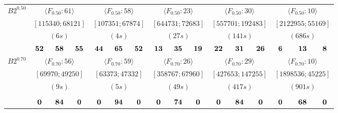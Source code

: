 \documentclass[12pt]{article}
\theoremstyle{thmstyleone}%
\theoremstyle{definition}
\begin{document}
\begin{table}[!ht]
\begin{tabular}{| l | c c c  | c c c | c c c | c c c | c c c | }
\textbf{$B2^{0.50}$}& \multicolumn{3}{c|}{$\langle F_{0.50}:61 \rangle$ }& \multicolumn{3}{c|}{$\langle F_{0.50}:58 \rangle$ }& \multicolumn{3}{c|}{$\langle F_{0.50}:23 \rangle$ }& \multicolumn{3}{c|}{$\langle F_{0.50}:30 \rangle$ }& \multicolumn{3}{c|}{$\langle F_{0.50}:10 \rangle$ } \\
& \multicolumn{3}{c|}{$[115340; 68121]$}& \multicolumn{3}{c|}{$[107351; 67874]$}& \multicolumn{3}{c|}{$[644731; 72683]$}& \multicolumn{3}{c|}{$[557701; 192483]$}& \multicolumn{3}{c|}{$[2122955; 55169]$} \\
& \multicolumn{3}{c|}{$(6s)$}& \multicolumn{3}{c|}{$(4s)$}& \multicolumn{3}{c|}{$(27s)$}& \multicolumn{3}{c|}{$(141s)$}& \multicolumn{3}{c|}{$(686s)$} \\ \hline
& $\bf 52$ & $\bf 58$ & $\bf 55$ & $\bf 44$ & $\bf 65$ & $\bf 52$ & $\bf 13$ & $\bf 35$ & $\bf 19$ & $\bf 22$ & $\bf 31$ & $\bf 26$ & $\bf 6$ & $\bf 13$ & $\bf 8$ \\

\textbf{$B2^{0.70}$}& \multicolumn{3}{c|}{$\langle F_{0.70}:56 \rangle$ }& \multicolumn{3}{c|}{$\langle F_{0.70}:59 \rangle$ }& \multicolumn{3}{c|}{$\langle F_{0.70}:26 \rangle$ }& \multicolumn{3}{c|}{$\langle F_{0.70}:29 \rangle$ }& \multicolumn{3}{c|}{$\langle F_{0.70}:10 \rangle$ } \\
& \multicolumn{3}{c|}{$[69970; 49250]$}& \multicolumn{3}{c|}{$[63373; 47332]$}& \multicolumn{3}{c|}{$[358767; 67960]$}& \multicolumn{3}{c|}{$[427653; 147255]$}& \multicolumn{3}{c|}{$[1898536; 45225]$} \\
& \multicolumn{3}{c|}{$(9s)$}& \multicolumn{3}{c|}{$(5s)$}& \multicolumn{3}{c|}{$(49s)$}& \multicolumn{3}{c|}{$(417s)$}& \multicolumn{3}{c|}{$(901s)$} \\ \hline


\multicolumn{1}{c}{}& \multicolumn{15}{c}{} \\ \hline
& $\bf 0$ & $\bf 84$ & $\bf 0$ & $\bf 0$ & $\bf 94$ & $\bf 0$ & $\bf 0$ & $\bf 74$ & $\bf 0$ & $\bf 0$ & $\bf 84$ & $\bf 0$ & $\bf 0$ & $\bf 68$ & $\bf 0$ \\


\end{tabular}
\end{table}
\end{document}
